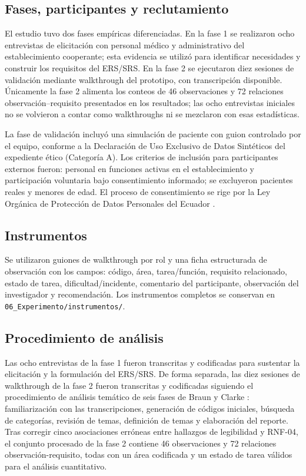 \documentclass[runningheads]{llncs}
\begin{document}
	\subsection{Fases, participantes y reclutamiento}
	El estudio tuvo dos fases empíricas diferenciadas. En la fase 1 se realizaron ocho entrevistas de elicitación con personal médico y administrativo del establecimiento cooperante; esta evidencia se utilizó para identificar necesidades y construir los requisitos del ERS/SRS. En la fase 2 se ejecutaron diez sesiones de validación mediante walkthrough del prototipo, con transcripción disponible. Únicamente la fase 2 alimenta los conteos de 46 observaciones y 72 relaciones observación--requisito presentados en los resultados; las ocho entrevistas iniciales no se volvieron a contar como walkthroughs ni se mezclaron con esas estadísticas.
	
	La fase de validación incluyó una simulación de paciente con guion controlado por el equipo, conforme a la Declaración de Uso Exclusivo de Datos Sintéticos del expediente ético (Categoría A). Los criterios de inclusión para participantes externos fueron: personal en funciones activas en el establecimiento y participación voluntaria bajo consentimiento informado; se excluyeron pacientes reales y menores de edad. El proceso de consentimiento se rige por la Ley Orgánica de Protección de Datos Personales del Ecuador \cite{loppd}.
	
	\subsection{Instrumentos}
	Se utilizaron guiones de walkthrough por rol y una ficha estructurada de observación con los campos: código, área, tarea/función, requisito relacionado, estado de tarea, dificultad/incidente, comentario del participante, observación del investigador y recomendación. Los instrumentos completos se conservan en \texttt{06\_Experimento/instrumentos/}.
	
	\subsection{Procedimiento de análisis}
	Las ocho entrevistas de la fase 1 fueron transcritas y codificadas para sustentar la elicitación y la formulación del ERS/SRS. De forma separada, las diez sesiones de walkthrough de la fase 2 fueron transcritas y codificadas siguiendo el procedimiento de análisis temático de seis fases de Braun y Clarke \cite{braunclarke2006}: familiarización con las transcripciones, generación de códigos iniciales, búsqueda de categorías, revisión de temas, definición de temas y elaboración del reporte. Tras corregir cinco asociaciones erróneas entre hallazgos de legibilidad y RNF-04, el conjunto procesado de la fase 2 contiene 46 observaciones y 72 relaciones observación-requisito, todas con un área codificada y un estado de tarea válidos para el análisis cuantitativo.
	
\end{document}
